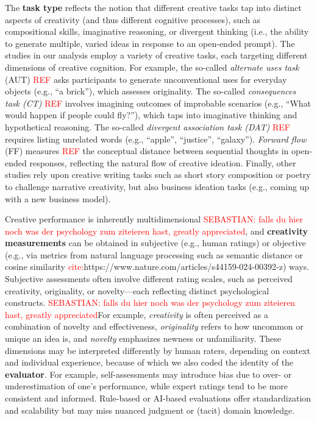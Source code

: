 \documentclass[manuscript, screen, review, acmsmall, anonymous]{acmart}
\newcommand{\TODO}[1]{\textcolor{red}{#1}}
\begin{document}
The \textbf{task type} reflects the notion that different creative tasks tap into distinct aspects of creativity (and thus different cognitive processes), such as compositional skills, imaginative reasoning, or divergent thinking (i.e., the ability to generate multiple, varied ideas in response to an open-ended prompt). The studies in our analysis employ a variety of creative tasks, each targeting different dimensions of creative cognition. For example, the so-called \emph{alternate uses task} (AUT) \TODO{REF} asks participants to generate unconventional uses for everyday objects (e.g., ``a brick''), which assesses originality. The so-called \emph{consequences task (CT)} \TODO{REF} involves imagining outcomes of improbable scenarios (e.g., ``What would happen if people could fly?''), which taps into imaginative thinking and hypothetical reasoning. The so-called \emph{divergent association task (DAT)} \TODO{REF}  requires listing unrelated words (e.g., ``apple'', ``justice'', ``galaxy''). \textit{Forward flow} (FF) measures \TODO{REF}  the conceptual distance between sequential thoughts in open-ended responses, reflecting the natural flow of creative ideation. Finally, other studies rely upon creative writing tasks such as short story composition or poetry to challenge narrative creativity, but also business ideation tasks (e.g., coming up with a new business model).


Creative performance is inherently multidimensional \TODO{SEBASTIAN: falls du hier noch was der psychology zum ziteieren hast, greatly appreciated}, and \textbf{creativity measurements} can be obtained in subjective (e.g., human ratings) or objective (e.g., via metrics from natural language processing such as semantic distance or cosine similarity \TODO{cite:}https://www.nature.com/articles/s44159-024-00392-z) ways. Subjective assessments often involve different rating scales, such as perceived creativity, originality, or novelty---each reflecting distinct psychological constructs. \TODO{SEBASTIAN: falls du hier noch was der psychology zum ziteieren hast, greatly appreciated}For example, \emph{creativity} is often perceived as a combination of novelty and effectiveness, \emph{originality} refers to how uncommon or unique an idea is, and \emph{novelty} emphasizes newness or unfamiliarity. These dimensions may be interpreted differently by human raters, depending on context and individual experience, because of which we also coded the identity of the \textbf{evaluator}. For example, self-assessments may introduce bias due to over- or underestimation of one's performance, while expert ratings tend to be more consistent and informed. Rule-based or AI-based evaluations offer standardization and scalability but may miss nuanced judgment or (tacit) domain knowledge. 
\end{document}
